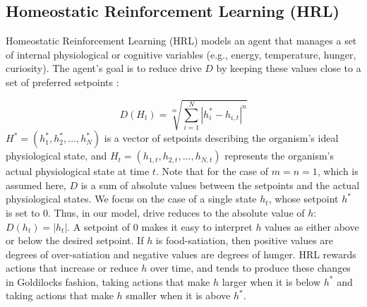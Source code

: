 \documentclass[12pt,fleqn]{article}
\begin{document}

\subsection{Homeostatic Reinforcement Learning (HRL)}\label{sec:hrl}

Homeostatic Reinforcement Learning (HRL) models an agent that manages a set of internal physiological or cognitive variables (e.g., energy, temperature, hunger, curiosity). The agent's goal is to reduce drive $D$ by keeping these values close to a set of preferred setpoints \cite{keramati_homeostatic_2014}:

\begin{equation}\label{eq:model-drive}
  D\left(H_t\right)=\sqrt[m]{\sum_{i=1}^N\left|h_i^*-h_{i, t}\right|^n}
\end{equation}
\(H^*=\left(h_1^*, h_2^*, \ldots, h_N^*\right)\) is a vector of setpoints describing the organism's ideal physiological state, and \(H_t=\left(h_{1, t}, h_{2, t}, \ldots, h_{N, t}\right)\) represents the organism's actual physiological state at time \(t\). Note that for the case of $m = n = 1$, which is assumed here, $D$ is a sum of absolute values between the setpoints and the actual physiological states. We focus on the case of a single state \(h_t\), whose setpoint \(h^*\) is set to \(0\). Thus, in our model, drive reduces to the absolute value of $h$: \(D(h_t)=|h_t|\). A setpoint of 0 makes it easy to interpret $h$ values as either above or below the desired setpoint. If $h$ is food-satiation, then positive values are degrees of over-satiation and negative values are degrees of hunger. HRL rewards actions that increase or reduce $h$ over time, and tends to produce these changes in Goldilocks fashion, taking actions that make $h$ larger when it is below \(h^*\) and taking actions that make $h$ smaller when it is above \(h^*\).
\end{document}

